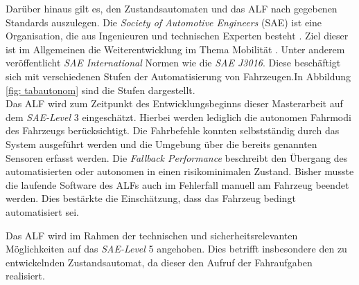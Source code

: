 	
	
	
	 
	
	Darüber hinaus gilt es, den Zustandsautomaten und das ALF nach gegebenen Standards auszulegen. Die \textit{Society of Automotive Engineers} (SAE) ist eine Organisation, die aus Ingenieuren und technischen Experten besteht \cite{saeorg}. Ziel dieser ist im Allgemeinen die Weiterentwicklung im Thema Mobilität \cite{saeorg}. Unter anderem veröffentlicht \textit{SAE International} Normen wie die \textit{SAE J3016}. Diese beschäftigt sich mit verschiedenen Stufen der Automatisierung von Fahrzeugen.In Abbildung \ref{fig: tabautonom} sind die Stufen dargestellt.\\
	
	Das ALF wird zum Zeitpunkt des Entwicklungsbeginns dieser Masterarbeit auf dem \textit{SAE-Level} 3 eingeschätzt. Hierbei werden lediglich die autonomen Fahrmodi des Fahrzeugs berücksichtigt. Die Fahrbefehle konnten selbstständig durch das System ausgeführt werden und die Umgebung über die bereits genannten Sensoren erfasst werden. Die \textit{Fallback Performance} beschreibt den Übergang des automatisierten oder autonomen in einen risikominimalen Zustand. Bisher musste die laufende Software des ALFs auch im Fehlerfall manuell am Fahrzeug beendet werden. Dies bestärkte die Einschätzung, dass das Fahrzeug bedingt automatisiert sei.	
	
	
	
	Das ALF wird im Rahmen der technischen und sicherheitsrelevanten Möglichkeiten auf das \textit{SAE-Level} 5 angehoben. Dies betrifft insbesondere den zu entwickelnden Zustandsautomat, da dieser den Aufruf der Fahraufgaben realisiert.\\
	  
	


		
	
		
		
				   		

